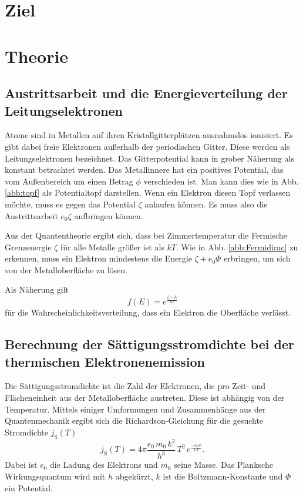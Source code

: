 \section{Ziel}


\section{Theorie}
\label{sec:Theorie}

\subsection{Austrittsarbeit und die Energieverteilung der Leitungselektronen}

Atome sind in Metallen auf ihren Kristallgitterplätzen 
ausnahmslos ionisiert. Es gibt dabei freie Elektronen außerhalb 
der periodischen Gitter. Diese werden als Leitungselektronen 
bezeichnet. Das Gitterpotential kann in grober Näherung als 
konstant betrachtet werden. Das Metallinnere hat ein positives 
Potential, das vom Außenbereich um einen Betrag $\phi$ 
verschieden ist. Man kann dies wie in Abb. \ref{abb:topf} %
als Potentialtopf darstellen. Wenn ein Elektron diesen Topf 
verlassen möchte, muss es gegen das Potential $\zeta$ 
anlaufen können. Es muss also die Austrittsarbeit $e_0 \zeta$ 
aufbringen können. 

\noindent Aus der Quantentheorie ergibt sich, dass bei Zimmertemperatur 
die Fermische Grenzenergie $\zeta$ für alle Metalle größer ist 
als $k T$. Wie in Abb. \ref{abb:Fermidirac} zu erkennen, muss %
ein Elektron mindestens die Energie $\zeta + e_0 \Phi$ 
erbringen, um sich von der Metalloberfläche zu lösen. 

\noindent Als Näherung gilt 
\begin{equation}
    f(E) = e^{\frac{\zeta - E}{k T}}
    \label{eqn:fermidirac}
\end{equation}
für die Wahrscheinlichkeitsverteilung, dass ein Elektron die 
Oberfläche  verlässt. 

\subsection{Berechnung der Sättigungsstromdichte bei der 
thermischen Elektronenemission}

Die Sättigungsstromdichte ist die Zahl der 
Elektronen, die pro Zeit- und Flächeneinheit aus der 
Metalloberfläche austreten. Diese ist abhängig von der 
Temperatur. Mittels einiger Umformungen und 
Zusammenhänge aus der Quantenmechanik ergibt sich die 
Richardson-Gleichung für die gesuchte Stromdichte $j_\text{S}(T)$ 
\begin{equation}
    j_\text{S}(T)= 4 \pi \frac{e_0 \, m_0 \, k^2}{h^3} \, T^2 \, e^{\frac{-e_0 \, \Phi}{k \, T}}.
    \label{eqn:richardson}
\end{equation} 
Dabei ist $e_0$ die Ladung des Elektrons und $m_0$ seine Masse. 
Das Planksche Wirkungsquantum wird mit $h$ abgekürzt, $k$ ist 
die Boltzmann-Konstante und $\Phi$ ein Potential. %


